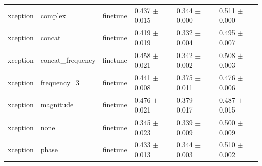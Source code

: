 \begin{table}
\begin{tabular}{llllll}
xception & complex & finetune & 0.437 $\pm$ 0.015 & 0.344 $\pm$ 0.000 & 0.511 $\pm$ 0.000 \\
xception & concat & finetune & 0.419 $\pm$ 0.019 & 0.332 $\pm$ 0.004 & 0.495 $\pm$ 0.007 \\
xception & concat_frequency & finetune & 0.458 $\pm$ 0.021 & 0.342 $\pm$ 0.002 & 0.508 $\pm$ 0.003 \\
xception & frequency_3 & finetune & 0.441 $\pm$ 0.008 & 0.375 $\pm$ 0.011 & 0.476 $\pm$ 0.006 \\
xception & magnitude & finetune & 0.476 $\pm$ 0.021 & 0.379 $\pm$ 0.017 & 0.487 $\pm$ 0.015 \\
xception & none & finetune & 0.345 $\pm$ 0.023 & 0.339 $\pm$ 0.009 & 0.500 $\pm$ 0.009 \\
xception & phase & finetune & 0.433 $\pm$ 0.013 & 0.344 $\pm$ 0.003 & 0.510 $\pm$ 0.002 \\
\bottomrule
\end{tabular}
\end{table}
